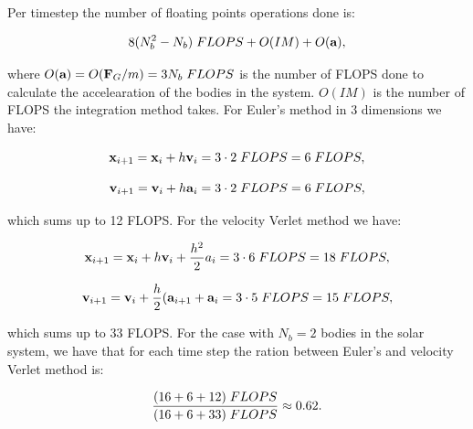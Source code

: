 \documentclass[a4paper, fontsize=11pt]{article}
\begin{document}
Per timestep the number of floating points operations done is:

\begin{equation}
8(N_b^2 - N_b) \hspace{1mm}  FLOPS + O(IM) + O(\textbf{a}),
\end{equation}

where $O(\textbf{a}) = O(\textbf{F}_{G} / m) = 3N_b \hspace{1mm} FLOPS$ is the number of FLOPS done to calculate the accelearation of the bodies in the system. $O(IM)$ is the number of FLOPS the integration method takes. For Euler's method in 3 dimensions we have:

\begin{equation}
\textbf{x}_{i + 1} = \textbf{x}_i + h \textbf{v}_i = 3 \cdot 2 \hspace{1mm} FLOPS = 6 \hspace{1mm} FLOPS,
\end{equation}

\begin{equation}
\textbf{v}_{i + 1} = \textbf{v}_i + h \textbf{a}_i = 3 \cdot 2 \hspace{1mm}  FLOPS = 6 \hspace{1mm} FLOPS,
\end{equation}

which sums up to 12 FLOPS. For the velocity Verlet method we have:

\begin{equation}
\textbf{x}_{i + 1} = \textbf{x}_i + h \textbf{v}_i + \frac{h^2}{2}a_i = 3 \cdot 6 \hspace{1mm} FLOPS = 18 \hspace{1mm} FLOPS,
\end{equation}

\begin{equation}
\textbf{v}_{i + 1} = \textbf{v}_i + \frac{h}{2}(\textbf{a}_{i+1} + \textbf{a}_i = 3 \cdot 5 \hspace{1mm} FLOPS = 15 \hspace{1mm} FLOPS,
\end{equation}

which sums up to 33 FLOPS. For the case with $N_b = 2$ bodies in the solar system, we have that for each time step the ration between Euler's and velocity Verlet method is:

\begin{equation}
\frac{(16 + 6 + 12) \hspace{1mm} FLOPS}{(16 + 6 + 33) \hspace{1mm} FLOPS} \approx 0.62.
\end{equation}
\end{document}
